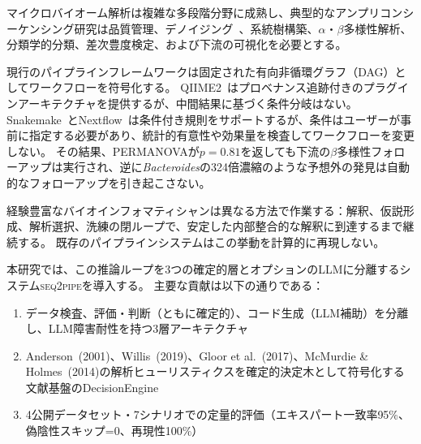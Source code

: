 \documentclass[11pt,a4paper]{article}
\newcommand{\seqpipe}{\textsc{seq2pipe}}
\begin{document}
マイクロバイオーム解析は複雑な多段階分野に成熟し、典型的なアンプリコンシーケンシング研究は品質管理、デノイジング~\citep{callahan2016}、系統樹構築、$\alpha$・$\beta$多様性解析、分類学的分類、差次豊度検定、および下流の可視化を必要とする。

現行のパイプラインフレームワークは固定された有向非循環グラフ（DAG）としてワークフローを符号化する。
QIIME2~\citep{qiime2}はプロベナンス追跡付きのプラグインアーキテクチャを提供するが、中間結果に基づく条件分岐はない。
Snakemake~\citep{snakemake}とNextflow~\citep{nextflow}は条件付き規則をサポートするが、条件はユーザーが事前に指定する必要があり、統計的有意性や効果量を検査してワークフローを変更しない。
その結果、PERMANOVAが$p = 0.81$を返しても下流の$\beta$多様性フォローアップは実行され、逆に\textit{Bacteroides}の324倍濃縮のような予想外の発見は自動的なフォローアップを引き起こさない。

経験豊富なバイオインフォマティシャンは異なる方法で作業する：解釈、仮説形成、解析選択、洗練の閉ループで、安定した内部整合的な解釈に到達するまで継続する。
既存のパイプラインシステムはこの挙動を計算的に再現しない。

本研究では、この推論ループを3つの確定的層とオプションのLLMに分離するシステム\seqpipe を導入する。
主要な貢献は以下の通りである：
\begin{enumerate}
  \item データ検査、評価・判断（ともに確定的）、コード生成（LLM補助）を分離し、LLM障害耐性を持つ3層アーキテクチャ
  \item Anderson~(2001)、Willis~(2019)、Gloor et al.~(2017)、McMurdie \& Holmes~(2014)の解析ヒューリスティクスを確定的決定木として符号化する文献基盤のDecisionEngine
  \item 4公開データセット・7シナリオでの定量的評価（エキスパート一致率95\%、偽陰性スキップ=0、再現性100\%）
\end{enumerate}
\end{document}
